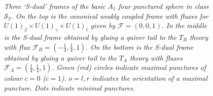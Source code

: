 \documentclass[main.tex]{subfiles}
\begin{document}
\begin{figure}
\caption{\textit{Three `S-dual' frames of the basic $A_1$ four punctured sphere in class $\mathcal{S}_2$. On the top is the canonical weakly coupled frame with fluxes for $U(1)_{\beta}\times U(1)_{\gamma}\times U(1)_t$ given by $\mathcal{F}=(0,0,1)$. In the middle is the S-dual frame obtained by gluing a quiver tail to the $T_B$ theory with flux $\mathcal{F}_B=(-\frac{1}{4},\frac{1}{4},1)$. On the bottom is the S-dual frame obtained by gluing a quiver tail to the $T_A$ theory with fluxes $\mathcal{F}_A=(\frac{1}{4},\frac{1}{4},1)$. Green (red) circles indicate maximal punctures of colour $c=0$ ($c=1$). $o=l,r$ indicates the orientation of a maximal puncture. Dots indicate minimal punctures.}}
\label{fig:sduals}
\end{figure}
\end{document}
